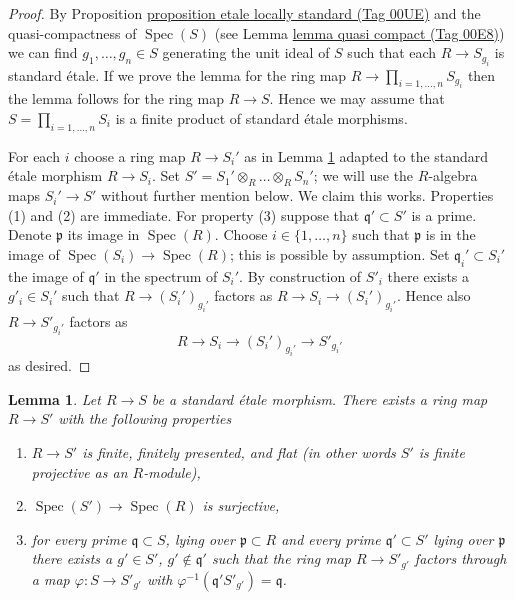 \documentclass{amsart}
\theoremstyle{plain}
\newtheorem{lemma}[subsection]{Lemma}
\theoremstyle{definition}
\theoremstyle{remark}
\numberwithin{equation}{subsection}
\def\Spec{\mathop{\mathrm{Spec}}}
\begin{document}
\begin{proof}
By Proposition \href{https://stacks.math.columbia.edu/tag/00UE}{proposition etale locally standard (Tag 00UE)} and
the quasi-compactness of $\Spec(S)$ (see Lemma \href{https://stacks.math.columbia.edu/tag/00E8}{lemma quasi compact (Tag 00E8)})
we can find $g_1, \ldots, g_n \in S$ generating the unit ideal
of $S$ such that each $R \to S_{g_i}$ is standard \'etale.
If we prove the lemma for the ring map $R \to \prod_{i = 1, \ldots, n} S_{g_i}$
then the lemma follows for the ring map $R \to S$.
Hence we may assume that $S = \prod_{i = 1, \ldots, n} S_i$
is a finite product of standard \'etale morphisms.

\medskip\noindent
For each $i$ choose a ring map $R \to S_i'$ as in
Lemma \ref{algebra-lemma-standard-etale-finite-flat-Zariski}
adapted to the standard \'etale morphism $R \to S_i$.
Set $S' = S_1' \otimes_R \ldots \otimes_R S_n'$; we will use
the $R$-algebra maps $S_i' \to S'$ without further mention below.
We claim this works. Properties (1) and (2) are immediate.
For property (3) suppose that $\mathfrak q' \subset S'$ is a prime.
Denote $\mathfrak p$ its image in $\Spec(R)$.
Choose $i \in \{1, \ldots, n\}$ such that $\mathfrak p$
is in the image of $\Spec(S_i) \to \Spec(R)$; this is
possible by assumption. Set $\mathfrak q_i' \subset S_i'$
the image of $\mathfrak q'$ in the spectrum of $S_i'$.
By construction of $S'_i$ there exists a $g'_i \in S_i'$
such that $R \to (S_i')_{g_i'}$ factors as
$R \to S_i \to (S_i')_{g_i'}$. Hence also
$R \to S'_{g_i'}$ factors as
$$
R \to S_i \to (S_i')_{g_i'} \to S'_{g_i'}
$$
as desired.
\end{proof}


\begin{lemma}
\label{algebra-lemma-standard-etale-finite-flat-Zariski}
Let $R \to S$ be a standard \'etale morphism.
There exists a ring map $R \to S'$ with the following properties
\begin{enumerate}
\item $R \to S'$ is finite, finitely presented, and flat
(in other words $S'$ is finite projective as an $R$-module),
\item $\Spec(S') \to \Spec(R)$ is surjective,
\item for every prime $\mathfrak q \subset S$, lying over
$\mathfrak p \subset R$ and every prime
$\mathfrak q' \subset S'$ lying over $\mathfrak p$ there exists
a $g' \in S'$, $g' \not \in \mathfrak q'$
such that the ring map $R \to S'_{g'}$ factors
through a map $\varphi : S \to S'_{g'}$ with
$\varphi^{-1}(\mathfrak q'S'_{g'}) = \mathfrak q$.
\end{enumerate}
\end{lemma}
\end{document}
